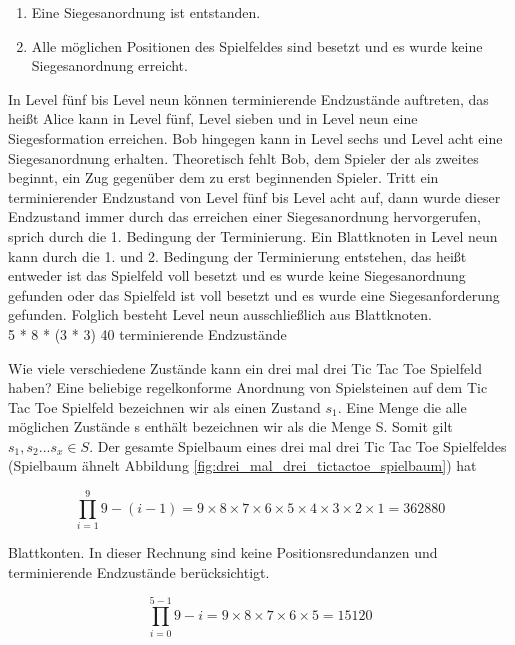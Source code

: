 \begin{enumerate}
\item Eine Siegesanordnung ist entstanden.
\item Alle möglichen Positionen des Spielfeldes sind besetzt und es wurde keine Siegesanordnung erreicht.
\end{enumerate}

In Level fünf bis Level neun können terminierende Endzustände auftreten, das heißt Alice kann in Level fünf, Level sieben und in Level neun eine Siegesformation erreichen. Bob hingegen kann in Level sechs und Level acht eine Siegesanordnung erhalten. Theoretisch fehlt Bob, dem Spieler der als zweites beginnt, ein Zug gegenüber dem zu erst beginnenden Spieler. Tritt ein terminierender Endzustand von Level fünf bis Level acht auf, dann wurde dieser Endzustand immer durch das erreichen einer Siegesanordnung hervorgerufen, sprich durch die 1. Bedingung der Terminierung. Ein Blattknoten in Level neun kann durch die 1. und 2. Bedingung der Terminierung entstehen, das heißt entweder ist das Spielfeld voll besetzt und es wurde keine Siegesanordnung gefunden oder das Spielfeld ist voll besetzt und es wurde eine Siegesanforderung gefunden. Folglich besteht Level neun ausschließlich aus Blattknoten. \\

5 * 8 * (3 * 3)
40 terminierende Endzustände

Wie viele verschiedene Zustände kann ein drei mal drei Tic Tac Toe Spielfeld haben?
Eine beliebige regelkonforme Anordnung von Spielsteinen auf dem Tic Tac Toe Spielfeld bezeichnen wir als einen Zustand $s_1$. Eine Menge die alle möglichen Zustände s enthält bezeichnen wir als die Menge S. Somit gilt $s_1, s_2 ... s_x \in S$. Der gesamte Spielbaum eines drei mal drei Tic Tac Toe Spielfeldes (Spielbaum ähnelt Abbildung \ref{fig:drei_mal_drei_tictactoe_spielbaum}) hat
 
\begin{equation}
\prod_{i=1}^{9} 9 - (i - 1) = 9 \times 8 \times 7 \times 6 \times 5 \times 4 \times 3 \times 2 \times 1 = 362880
\end{equation}

Blattkonten. In dieser Rechnung sind keine Positionsredundanzen und terminierende Endzustände berücksichtigt.
 

\begin{equation}
\prod_{i=0}^{5 - 1} 9 - i = 9 \times 8 \times 7 \times 6 \times 5 = 15120
\end{equation}

